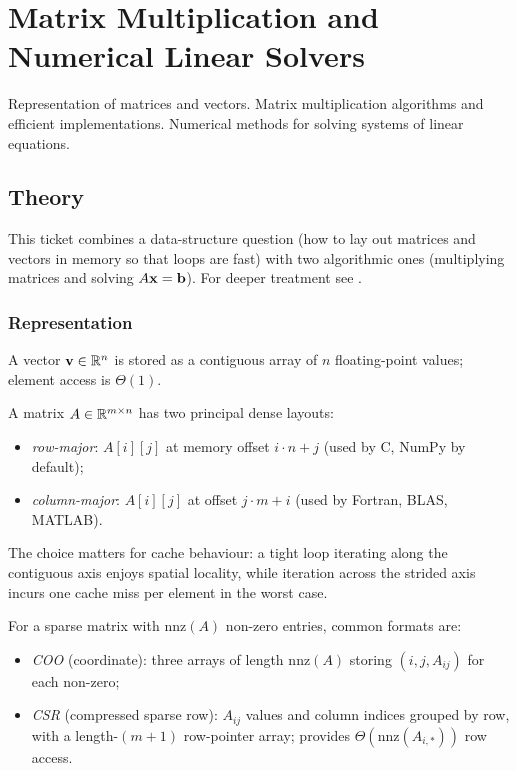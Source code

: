 
\section{Matrix Multiplication and Numerical Linear Solvers}
\label{sec:1.3.04-matrix-numerical-linear}

\begin{ticket}
Representation of matrices and vectors. Matrix multiplication algorithms and efficient implementations. Numerical methods for solving systems of linear equations.
\end{ticket}

\subsection*{Theory}

This ticket combines a data-structure question (how to lay out
matrices and vectors in memory so that loops are fast) with two
algorithmic ones (multiplying matrices and solving $A \mathbf{x} = \mathbf{b}$).
For deeper treatment see \cite[Ch.~28]{CLRS2013}.

\subsubsection*{Representation}

A vector $\mathbf{v} \in \mathbb{R}^n$ is stored as a contiguous array of $n$
floating-point values; element access is $\Theta(1)$.

A matrix $A \in \mathbb{R}^{m \times n}$ has two principal dense layouts:
\begin{itemize}
  \item \emph{row-major}: $A[i][j]$ at memory offset $i \cdot n + j$
        (used by C, NumPy by default);
  \item \emph{column-major}: $A[i][j]$ at offset $j \cdot m + i$
        (used by Fortran, BLAS, MATLAB).
\end{itemize}
The choice matters for cache behaviour: a tight loop iterating along
the contiguous axis enjoys spatial locality, while iteration across
the strided axis incurs one cache miss per element in the worst case.

For a sparse matrix with $\mathrm{nnz}(A)$ non-zero entries, common
formats are:
\begin{itemize}
  \item \emph{COO} (coordinate): three arrays of length $\mathrm{nnz}(A)$
        storing $(i, j, A_{ij})$ for each non-zero;
  \item \emph{CSR} (compressed sparse row): $A_{ij}$ values and column
        indices grouped by row, with a length-$(m+1)$ row-pointer array;
        provides $\Theta(\mathrm{nnz}(A_{i,*}))$ row access.
\end{itemize}

